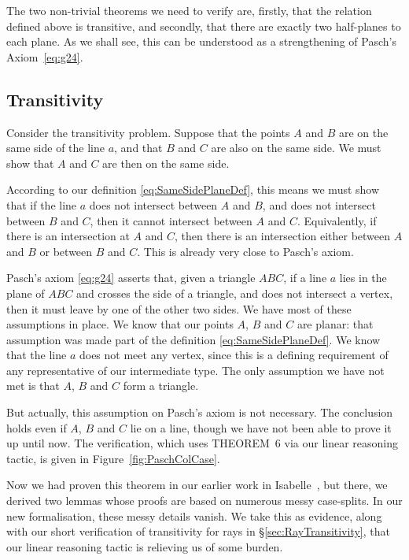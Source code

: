 The two non-trivial theorems we need to verify are, firstly, that the relation defined above is transitive, and secondly, that there are exactly two half-planes to each plane. As we shall see, this can be understood as a strengthening of Pasch's Axiom~\eqref{eq:g24}.

\subsection{Transitivity}
Consider the transitivity problem. Suppose that the points $A$ and $B$ are on the same side of the line $a$, and that $B$ and $C$ are also on the same side. We must show that $A$ and $C$ are then on the same side.

According to our definition \eqref{eq:SameSidePlaneDef}, this means we must show that if the line $a$ does not intersect between $A$ and $B$, and does not intersect between $B$ and $C$, then it cannot intersect between $A$ and $C$. Equivalently, if there is an intersection at $A$ and $C$, then there is an intersection either between $A$ and $B$ or between $B$ and $C$. This is already very close to Pasch's axiom.

Pasch's axiom \eqref{eq:g24} asserts that, given a triangle $ABC$, if a line $a$ lies in the plane of $ABC$ and crosses the side of a triangle, and does not intersect a vertex, then it must leave by one of the other two sides. We have most of these assumptions in place. We know that our points $A$, $B$ and $C$ are planar: that assumption was made part of the definition \eqref{eq:SameSidePlaneDef}. We know that the line $a$ does not meet any vertex, since this is a defining requirement of any representative of our intermediate type. The only assumption we have not met is that $A$, $B$ and $C$ form a triangle.

But actually, this assumption on Pasch's axiom is not necessary. The conclusion holds even if $A$, $B$ and $C$ lie on a line, though we have not been able to prove it up until now. The verification, which uses THEOREM~6 via our linear reasoning tactic, is given in Figure~\ref{fig:PaschColCase}. 

Now we had proven this theorem in our earlier work in Isabelle~\cite{ScottMScThesis}, but there, we derived two lemmas whose proofs are based on numerous messy case-splits. In our new formalisation, these messy details vanish. We take this as evidence, along with our short verification of transitivity for rays in \S\ref{sec:RayTransitivity}, that our linear reasoning tactic is relieving us of some burden.

